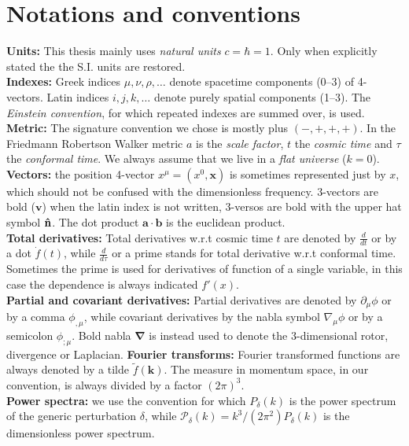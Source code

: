\section*{Notations and conventions}
\vspace*{\fill}
\textbf{Units:} This thesis mainly uses \emph{natural units} $c=\hbar=1$. Only when explicitly stated the the S.I. units are restored.\\  
\textbf{Indexes:} Greek indices $\mu,\nu,\rho,\dots$ denote spacetime components (0--3) of 4-vectors. Latin indices $i,j,k,\dots$ denote purely spatial components (1--3). The \emph{Einstein convention}, for which repeated indexes are summed over, is used. \\
\textbf{Metric:} The signature convention we chose is mostly plus $(-,+,+,+)$. In the Friedmann Robertson Walker metric $a$ is the \emph{scale factor}, $t$ the \emph{cosmic time} and $\tau$ the \emph{conformal time}. We always assume that we live in a \emph{flat universe} ($k=0$).\\
\textbf{Vectors:} the position 4-vector $x^\mu=(x^0,\mathbf x)$ is sometimes represented just by $x$, which should not be confused with the dimensionless frequency. 3-vectors are bold ($\mathbf v$) when the latin index is not written, 3-versos are bold with the upper hat symbol $\mathbf{\hat{n}}$. The dot product $\mathbf{a\cdot b}$ is the euclidean product. \\
\textbf{Total derivatives:} Total derivatives w.r.t cosmic time $t$ are denoted by $\tfrac d{dt}$ or by a dot $\dot f(t)$, while $\tfrac d{d\tau}$ or a prime stands for total derivative w.r.t conformal time. Sometimes the prime is used for derivatives of function of a single variable, in this case the dependence is always indicated $f'(x)$.\\
\textbf{Partial and covariant derivatives:} Partial derivatives are denoted by $\partial_\mu\phi$ or by a comma $\phi_{,\mu}$, while covariant derivatives by the nabla symbol $\nabla_\mu\phi$ or by a semicolon $\phi_{;\mu}$. Bold nabla $\boldsymbol\nabla$ is instead used to denote the 3-dimensional rotor, divergence or Laplacian.
\textbf{Fourier transforms:} Fourier transformed functions are always denoted by a tilde $\tilde f(\mathbf k)$. The measure in momentum space, in our convention, is always divided by a factor $(2\pi)^3$.  \\
\textbf{Power spectra:} we use the convention for which $P_\delta(k)$ is the power spectrum of the generic perturbation $\delta$, while $\mathcal P_\delta(k)=k^3/(2\pi^2) P_\delta(k)$ is the dimensionless power spectrum. 
